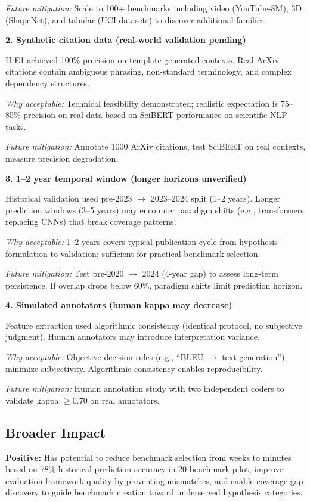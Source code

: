\textit{Future mitigation:} Scale to 100+ benchmarks including video (YouTube-8M), 3D (ShapeNet), and tabular (UCI datasets) to discover additional families.

\textbf{2. Synthetic citation data (real-world validation pending)}

H-E1 achieved 100\% precision on template-generated contexts. Real ArXiv citations contain ambiguous phrasing, non-standard terminology, and complex dependency structures.

\textit{Why acceptable:} Technical feasibility demonstrated; realistic expectation is 75--85\% precision on real data based on SciBERT performance on scientific NLP tasks.

\textit{Future mitigation:} Annotate 1000 ArXiv citations, test SciBERT on real contexts, measure precision degradation.

\textbf{3. 1--2 year temporal window (longer horizons unverified)}

Historical validation used pre-2023 $\rightarrow$ 2023--2024 split (1--2 years). Longer prediction windows (3--5 years) may encounter paradigm shifts (e.g., transformers replacing CNNs) that break coverage patterns.

\textit{Why acceptable:} 1--2 years covers typical publication cycle from hypothesis formulation to validation; sufficient for practical benchmark selection.

\textit{Future mitigation:} Test pre-2020 $\rightarrow$ 2024 (4-year gap) to assess long-term persistence. If overlap drops below 60\%, paradigm shifts limit prediction horizon.

\textbf{4. Simulated annotators (human kappa may decrease)}

Feature extraction used algorithmic consistency (identical protocol, no subjective judgment). Human annotators may introduce interpretation variance.

\textit{Why acceptable:} Objective decision rules (e.g., ``BLEU $\rightarrow$ text generation'') minimize subjectivity. Algorithmic consistency enables reproducibility.

\textit{Future mitigation:} Human annotation study with two independent coders to validate kappa $\geq 0.70$ on real annotators.

\subsection{Broader Impact}

\textbf{Positive:} Has potential to reduce benchmark selection from weeks to minutes based on 78\% historical prediction accuracy in 20-benchmark pilot, improve evaluation framework quality by preventing mismatches, and enable coverage gap discovery to guide benchmark creation toward underserved hypothesis categories.

